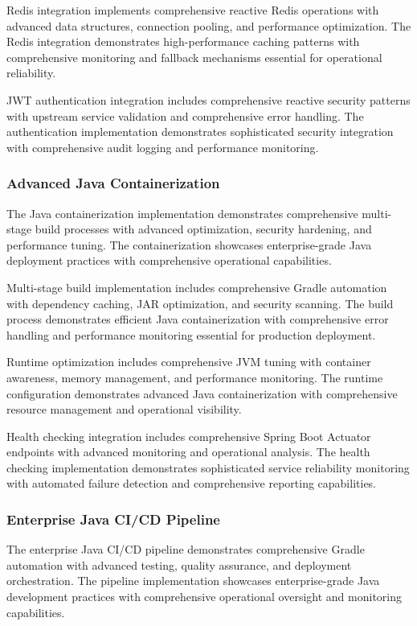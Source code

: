 Redis integration implements comprehensive reactive Redis operations with advanced data structures, connection pooling, and performance optimization. The Redis integration demonstrates high-performance caching patterns with comprehensive monitoring and fallback mechanisms essential for operational reliability.

JWT authentication integration includes comprehensive reactive security patterns with upstream service validation and comprehensive error handling. The authentication implementation demonstrates sophisticated security integration with comprehensive audit logging and performance monitoring.

\subsubsection{Advanced Java Containerization}

The Java containerization implementation demonstrates comprehensive multi-stage build processes with advanced optimization, security hardening, and performance tuning. The containerization showcases enterprise-grade Java deployment practices with comprehensive operational capabilities.

Multi-stage build implementation includes comprehensive Gradle automation with dependency caching, JAR optimization, and security scanning. The build process demonstrates efficient Java containerization with comprehensive error handling and performance monitoring essential for production deployment.

Runtime optimization includes comprehensive JVM tuning with container awareness, memory management, and performance monitoring. The runtime configuration demonstrates advanced Java containerization with comprehensive resource management and operational visibility.

Health checking integration includes comprehensive Spring Boot Actuator endpoints with advanced monitoring and operational analysis. The health checking implementation demonstrates sophisticated service reliability monitoring with automated failure detection and comprehensive reporting capabilities.

\subsubsection{Enterprise Java CI/CD Pipeline}

The enterprise Java CI/CD pipeline demonstrates comprehensive Gradle automation with advanced testing, quality assurance, and deployment orchestration. The pipeline implementation showcases enterprise-grade Java development practices with comprehensive operational oversight and monitoring capabilities.


